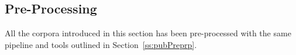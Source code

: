 \documentclass[a4paper,11pt]{article}
\begin{document}


\subsection{Pre-Processing}
\label{ss:genPreprp}

All the corpora introduced in this section has been pre-processed with the same pipeline and tools outlined in Section~\ref{ss:pubPreprp}.

% 
% 
% 
% 
\end{document}
